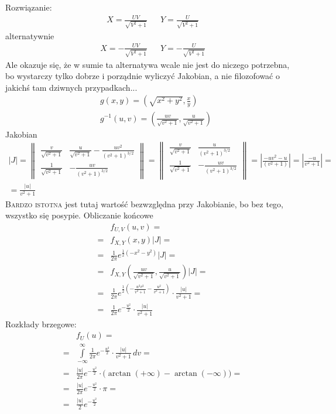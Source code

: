 Rozwiązanie:
\begin{align*}
X=\frac{U V}{\sqrt{V^2+1}} && Y=\frac{U}{\sqrt{V^2+1}}
\end{align*}
alternatywnie
\begin{align*}
X=-\frac{U V}{\sqrt{V^2+1}} && Y=-\frac{U}{\sqrt{V^2+1}}
\end{align*}
Ale okazuje się, że w sumie ta alternatywa wcale nie jest do niczego potrzebna, bo wystarczy tylko dobrze i porządnie wyliczyć Jakobian, a nie filozofować o jakichś tam dziwnych przypadkach...
\begin{align*}
&g(x,y)=\left(\sqrt{x^2+y^2},\frac{x}{y}\right)\\
&g^{-1}(u,v)=\left( \frac{u v}{\sqrt{v^2+1}},\frac{u}{\sqrt{v^2+1}}\right)
\end{align*}
Jakobian
\begin{gather*}
|J|=
\begin{Vmatrix}
\frac{v}{\sqrt{v^2+1}} & \frac{u}{\sqrt{v^2+1}}-\frac{u
v^2}{\left(v^2+1\right)^{3/2}} \\
\frac{1}{\sqrt{v^2+1}} & -\frac{u v}{\left(v^2+1\right)^{3/2}}
\end{Vmatrix}
=
\begin{Vmatrix}
\frac{v}{\sqrt{v^2+1}} & \frac{u}{\left(v^2+1\right)^{3/2}} \\
\frac{1}{\sqrt{v^2+1}} & -\frac{u v}{\left(v^2+1\right)^{3/2}} \\
\end{Vmatrix}
=
\left|\frac{-uv^2-u}{\left(v^2+1\right)}\right|
=
\left|\frac{-u}{v^2+1}\right|
=\\=
\frac{|u|}{v^2+1}
\end{gather*}
\textsc{Bardzo istotna} jest tutaj wartość bezwzględna przy Jakobianie, bo bez tego, wszystko się posypie. Obliczanie końcowe
\begin{align*}
&f_{U,V}(u,v)
=\\=&
f_{X,Y}(x,y)|J|
=\\=&
\frac{1}{2 \pi }e^{\frac{1}{2} \left(-x^2-y^2\right)}|J|
=\\=&
f_{X,Y}\left(\frac{u v}{\sqrt{v^2+1}},\frac{u}{\sqrt{v^2+1}}\right)|J|
=\\=&
\frac{1}{2
\pi }e^{\frac{1}{2} \left(-\frac{u^2 v^2}{v^2+1}-\frac{u^2}{v^2+1}\right)}\cdot\frac{|u|}{v^2+1}
=\\=&
\frac{1}{2 \pi }e^{-\frac{u^2}{2}}\cdot\frac{|u|}{v^2+1}
\end{align*}
Rozkłady brzegowe:
\begin{align*}
&f_U(u)
=\\=&
\int\limits_{-\infty }^{\infty }
\frac{1}{2 \pi }e^{-\frac{u^2}{2}}\cdot\frac{|u|}{v^2+1}\,dv
=\\=&
\frac{|u|}{2 \pi }e^{-\frac{u^2}{2}}\cdot\bigl(\arctan(+\infty )-\arctan(-\infty )\bigr)
=\\=&
\frac{|u|}{2 \pi }e^{-\frac{u^2}{2}}\cdot\pi 
=\\=&
\frac{|u|}{2 }e^{-\frac{u^2}{2}}
\end{align*}
